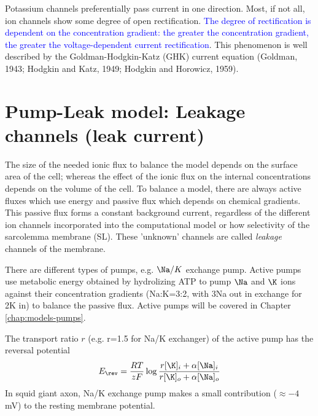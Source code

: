 Potassium channels preferentially pass current in one direction.
Most, if not all, ion channels show some degree of open rectification.
\textcolor{blue}{The degree of rectification is dependent on the concentration
gradient: the greater the concentration gradient, the greater the
voltage-dependent current rectification}. This phenomenon is well described by
the Goldman-Hodgkin-Katz (GHK) current equation (Goldman, 1943; Hodgkin and
Katz, 1949; Hodgkin and Horowicz, 1959).


\section{Pump-Leak model: Leakage channels (leak current)}

The size of the needed ionic flux to balance the model depends on the surface
area of the cell; whereas the effect of the ionic flux on the internal
concentrations depends on the volume of the cell. To balance a model, there are
always active fluxes which use energy and passive flux which depends on chemical
gradients. This passive flux forms a constant background current, regardless of
the different ion channels incorporated into the computational model or how
selectivity of the sarcolemma membrane (SL). These 'unknown' channels are called
{\it leakage} channels of the membrane.


There are different types of pumps, e.g. $\Na/K$ exchange pump. Active pumps use
metabolic energy obtained by hydrolizing ATP to pump $\Na$ and $\K$ ions against
their concentration gradients (Na:K=3:2, with 3Na out in exchange for 2K in) to
balance the passive flux. Active pumps will be covered in Chapter
\ref{chap:models-pumps}.

The transport ratio $r$ (e.g. r=1.5 for Na/K exchanger) of the active pump has
the reversal potential
\begin{equation}
E_\rev = \frac{RT}{zF}\log \frac{r[\K]_i + \alpha [\Na]_i}{r[\K]_o + \alpha
[\Na]_o}
\end{equation}
In squid giant axon, Na/K exchange pump makes a small contribution ($\approx
-4$mV) to the resting membrane potential.

